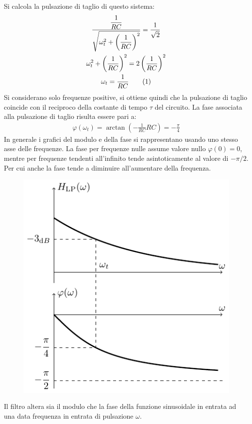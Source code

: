 \documentclass{article}
\newcommand{\tageq}{\tag{\stepcounter{equation}\theequation}}
\numberwithin{equation}{subsection}
\begin{document}
Si calcola la pulsazione di taglio di questo sistema:
\begin{gather*}
    \displaystyle\frac{\displaystyle\frac{1}{RC}}{\sqrt{\omega_t^2+\left(\displaystyle\frac{1}{RC}\right)^2}}=\frac{1}{\sqrt2}\\
    \omega_t^2+\left(\displaystyle\frac{1}{RC}\right)^2=2\left(\frac{1}{RC}\right)^2\\
    \omega_t=\displaystyle\frac{1}{RC}\tageq
\end{gather*}
Si considerano solo frequenze positive, si ottiene quindi che la pulsazione di taglio coincide con il reciproco della costante di tempo $\tau$ del circuito. 
La fase associata alla pulsazione di taglio risulta essere pari a:
\begin{gather*}
    \varphi(\omega_t)=\arctan\left(-\displaystyle\frac{1}{RC}RC\right)=-\frac{\pi}{4}
\end{gather*}
In generale i grafici del modulo e della fase si rappresentano usando uno stesso asse delle frequenze. La fase per frequenze nulle assume valore nullo $\varphi(0)=0$, 
mentre per frequenze tendenti all'infinito tende asintoticamente al valore di $-\pi/2$. Per cui anche la fase tende a diminuire all'aumentare della frequenza. 
\begin{figure}[H]%
    \centering
    \includegraphics{passa-basso-primo-ordine.pdf}%
\end{figure}
Il filtro altera sia il modulo che la fase della funzione sinusoidale in entrata ad una data frequenza in entrata di pulsazione $\omega$. 
\end{document}
